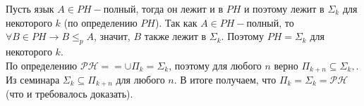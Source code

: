 \documentclass[a4paper,12pt]{article} %
\begin{document}
Пусть язык $A \in PH-\text{полный}$, тогда он лежит и в $ PH $ и поэтому лежит в $ \Sigma_k $ для некоторого $ k $ (по определению $ PH $). Так как $A \in PH-\text{полный}$, то $ \forall B \in PH \longrightarrow B \leq_p A $, значит, $ B $ также лежит в $ \Sigma_k $. Поэтому $ PH = \Sigma_k $ для некоторого $ k $.\\
По определению $ \mathcal{PH} = = \cup \Pi_k = \Sigma_k$, поэтому для любого $ n $ верно $\Pi_{k+n} \subseteq \Sigma_k,$. Из семинара $\Sigma_k \subseteq \Pi_{k+n}$ для любого $ n $. В итоге получаем, что $\Pi_k = \Sigma_k = \mathcal{PH}$ (что и требовалось доказать).
\end{document}
